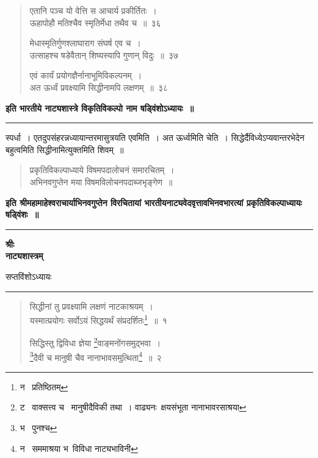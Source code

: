 \documentclass[11pt, openany]{book}
\begin{document}
\newpage

\begin{quote}
{\na एतानि पञ्च यो वेत्ति स आचार्य प्रकीर्तितः~।\\
ऊहापोहौ मतिश्चैव स्मृतिर्मेधा तथैव च~॥~३६

मेधास्मृतिर्गुणश्लाघाराग संघर्ष एव च~।\\
उत्साहश्च षडेवैतान् शिष्यस्यापि गुणान् विदुः~॥~३७

एवं कार्यं प्रयोगज्ञैर्नानाभूमिविकल्पनम्~।\\
अत ऊर्ध्वं प्रवक्ष्यामि सिद्धीनामपि लक्षणम्~॥~३८}
\end{quote}

\begin{center}
\textbf{इति भारतीये नाट्यशास्त्रे विकृतिविकल्पो नाम षड्विंशोऽध्यायः~॥}
\end{center}

\hrule

\noindent
स्पर्धा~। एतदुपसंहरन्नध्यायान्तरमासुत्रयति एवमिति~। अत ऊर्ध्वमिति चेति~। सिद्धेर्दैविध्येऽप्यवान्तरभेदेन बहुत्वमिति सिद्धीनामित्युक्तमिति शिवम्~॥

\begin{quote}
{\qt प्रकृतिविकल्पाध्याये विषमपदालोचनं समारचितम्~।\\
अभिनवगुप्तेन मया विषमविलोचनपदाब्जभृङ्गेण~॥}
\end{quote}

\begin{center}
\textbf{इति श्रीमहामाहेश्वराचार्याभिनवगुप्तेन विरचितायां भारतीयनाट्यवेदवृत्तावभिनवभारत्यां प्रकृतिविकल्पाध्यायः षड्विंशः~॥}\\

\vspace{2mm}
\rule{0.2\linewidth}{0.5pt}
\end{center}

\newpage
\thispagestyle{empty}
\begin{center}
\textbf{\large श्रीः}\\

\vspace{2mm}
\textbf{\huge नाट्यशास्त्रम्}

\vspace{2mm}
सप्तविंशोऽध्यायः

\vspace{2mm}
\rule{0.2\linewidth}{0.5pt}
\end{center}

\begin{quote}
{\na सिद्धीनां तु प्रवक्ष्यामि लक्षणं नाटकाश्रयम्~।\\
यस्मात्प्रयोगः सर्वोऽयं सिद्धयर्थं संप्रदर्शितः\renewcommand{\thefootnote}{1}\footnote{न \textendash\  प्रतिष्ठितम्}~॥~१

सिद्धिस्तु द्विविधा ज्ञेया \renewcommand{\thefootnote}{2}\footnote{ट \textendash\  वाक्सत्त्व च \textendash\  मानुषीदैविकी तथा~। वाढ्यनः\textendash\ क्षयसंभूता नानाभावरसाश्रया}वाङ्मनोंगसमुद्भवा~।\\
\renewcommand{\thefootnote}{3}\footnote{भ \textendash\ पुनश्च}दैवी च मानुषी चैव नानाभावसमुत्थिता\renewcommand{\thefootnote}{4}\footnote{न \textendash\  सममाश्रया भ\textendash\  विविधा नाट्यभाविनी}~॥~२}
\end{quote}
\end{document}
